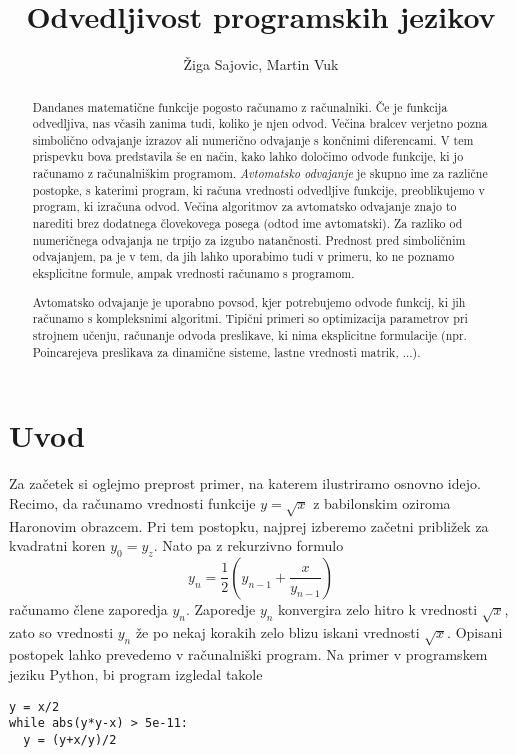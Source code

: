 \documentclass{article}
\title{Odvedljivost programskih jezikov}
\author{Žiga Sajovic, Martin Vuk}
\begin{document}
\maketitle
\begin{abstract}
  Dandanes matematične funkcije pogosto računamo z računalniki. Če je funkcija
  odvedljiva, nas včasih zanima tudi, koliko je njen odvod. Večina bralcev verjetno
  pozna simbolično odvajanje izrazov ali numerično odvajanje s končnimi
  diferencami. V tem prispevku bova predstavila še en način, kako lahko določimo
  odvode funkcije, ki jo računamo z računalniškim programom. \emph{Avtomatsko
    odvajanje} je skupno ime za različne postopke, s katerimi program, ki računa
  vrednosti odvedljive funkcije, preoblikujemo v program, ki izračuna odvod. 
  Večina algoritmov za avtomatsko odvajanje znajo to narediti brez dodatnega
  človekovega posega (odtod ime avtomatski). Za razliko
  od numeričnega odvajanja ne trpijo za izgubo natančnosti. Prednost pred
  simboličnim odvajanjem, pa je v tem, da jih lahko uporabimo tudi v primeru, ko
  ne poznamo eksplicitne formule, ampak vrednosti računamo s programom.

  Avtomatsko odvajanje je uporabno povsod, kjer potrebujemo 
  odvode funkcij, ki jih računamo s kompleksnimi algoritmi. Tipični primeri so
  optimizacija parametrov pri strojnem učenju, računanje odvoda preslikave, ki nima
  eksplicitne formulacije (npr. Poincarejeva preslikava za dinamične sisteme,
  lastne vrednosti matrik, ...).
\end{abstract}
\section{Uvod}
Za začetek si oglejmo preprost primer, na katerem ilustriramo osnovno idejo.
Recimo, da računamo vrednosti funkcije $y=\sqrt{x}$ z babilonskim oziroma Haronovim obrazcem.
Pri tem postopku, najprej izberemo začetni približek za
kvadratni koren $y_0=y_z$. Nato pa z rekurzivno formulo
\begin{equation*}
  y_n=\frac{1}{2}\left( y_{n-1}+\frac{x}{y_{n-1}} \right)
\end{equation*}
računamo člene zaporedja $y_n$. Zaporedje $y_n$ konvergira zelo hitro k
vrednosti $\sqrt{x}$, zato so vrednosti $y_n$ že po nekaj korakih zelo blizu
iskani vrednosti $\sqrt{x}$. Opisani postopek lahko prevedemo v računalniški
program. Na primer v programskem jeziku Python, bi program izgledal takole 

\begin{verbatim}
y = x/2
while abs(y*y-x) > 5e-11:
  y = (y+x/y)/2
\end{verbatim}
\end{document}
